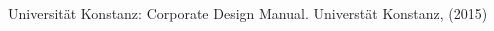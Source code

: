 \documentclass[11pt, rgb]{scrreprt}
\begin{document}
\begin{thebibliography}{[MB91a]}

\normalsize
\sffamily

\setlength{\itemsep}{6pt}

Universität Konstanz: Corporate Design Manual.
Universtät Konstanz, (2015)

\end{thebibliography}

\end{document}
